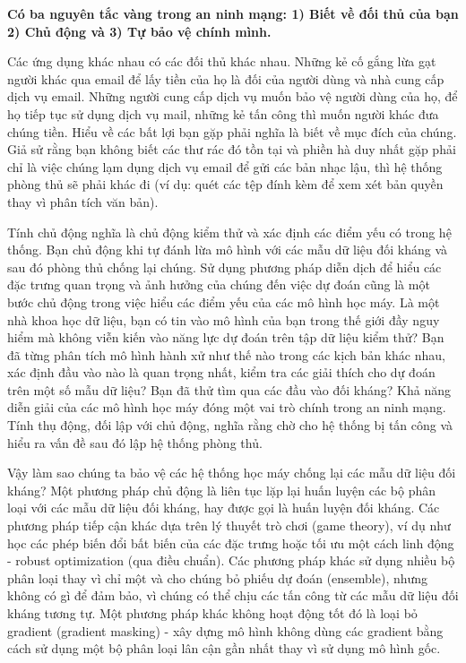 \textbf{Có ba nguyên tắc vàng trong an ninh mạng: 1) Biết về đối thủ của bạn 2) Chủ động và 3) Tự bảo vệ chính mình.}

Các ứng dụng khác nhau có các đối thủ khác nhau. Những kẻ cố gắng lừa gạt người khác qua email để lấy tiền của họ là đối của người dùng và nhà cung cấp dịch vụ email. Những người cung cấp dịch vụ muốn bảo vệ người dùng của họ, để họ tiếp tục sử dụng dịch vụ mail, những kẻ tấn công thì muốn người khác đưa chúng tiền. Hiểu về các bất lợi bạn gặp phải nghĩa là biết về mục đích của chúng. Giả sử rằng bạn không biết các thư rác đó tồn tại và phiền hà duy nhất gặp phải chỉ là việc chúng lạm dụng dịch vụ email để gửi các bản nhạc lậu, thì hệ thống phòng thủ sẽ phải khác đi (ví dụ: quét các tệp đính kèm để xem xét bản quyền thay vì phân tích văn bản).

Tính chủ động nghĩa là chủ động kiểm thử và xác định các điểm yếu có trong hệ thống. Bạn chủ động khi tự đánh lừa mô hình với các mẫu dữ liệu đối kháng và sau đó phòng thủ chống lại chúng. Sử dụng phương pháp diễn dịch để hiểu các đặc trưng  quan trọng và ảnh hưởng của chúng đến việc dự đoán cũng là một bước chủ động trong việc hiểu các điểm yếu của các mô hình học máy. Là một nhà khoa học dữ liệu, bạn có tin vào mô hình của bạn trong thế giới đầy nguy hiểm mà không viễn kiến vào năng lực dự đoán trên tập dữ liệu kiểm thử? Bạn đã từng phân tích mô hình hành xử như thế nào trong các kịch bản khác nhau, xác định đầu vào nào là quan trọng nhất, kiểm tra các giải thích cho dự đoán trên một số mẫu dữ liệu? Bạn đã thử tìm qua các đầu vào đối kháng? Khả năng diễn giải của các mô hình học máy đóng một vai trò chính trong an ninh mạng. Tính thụ động, đối lập với chủ động, nghĩa rằng chờ cho hệ thống bị tấn công và hiểu ra vấn đề sau đó lập hệ thống phòng thủ.

Vậy làm sao chúng ta bảo vệ các hệ thống học máy chống lại các mẫu dữ liệu đối kháng? Một phương pháp chủ động là liên tục lặp lại huấn luyện các bộ phân loại với các mẫu dữ liệu đối kháng, hay được gọi là huấn luyện đối kháng. Các phương pháp tiếp cận khác dựa trên lý thuyết trò chơi (game theory), ví dụ như học các phép biến đổi bất biến của các đặc trưng hoặc tối ưu một cách linh động - robust optimization (qua điều chuẩn). Các phương pháp khác sử dụng nhiều bộ phân loại thay vì chỉ một và cho chúng bỏ phiếu dự đoán (ensemble), nhưng không có gì để đảm bảo, vì chúng có thể chịu các tấn công từ các mẫu dữ liệu đối kháng tương tự. Một phương pháp khác không hoạt động tốt đó là loại bỏ gradient (gradient masking) - xây dựng mô hình không dùng các gradient bằng cách sử dụng một bộ phân loại lân cận gần nhất thay vì sử dụng mô hình gốc.

